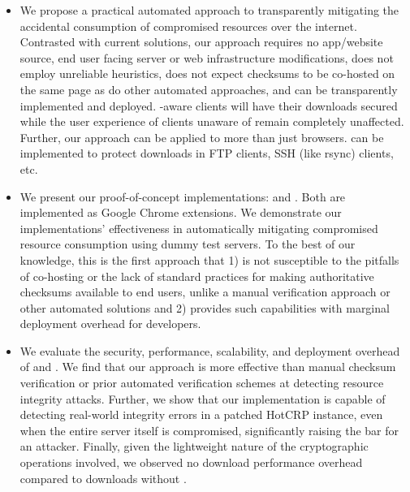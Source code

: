 \begin{itemize}

  \item We propose a practical automated approach to transparently mitigating
  the accidental consumption of compromised resources over the internet.
  Contrasted with current solutions, our approach requires no app/website
  source, end user facing server or web infrastructure modifications, does not
  employ unreliable heuristics, does not expect checksums to be co-hosted on the
  same page as do other automated approaches, and can be transparently
  implemented and deployed. \SYSTEM{}-aware clients will have their downloads
  secured while the user experience of clients unaware of \SYSTEM{} remain
  completely unaffected. Further, our approach can be applied to more than just
  browsers. \SYSTEM{} can be implemented to protect downloads in FTP clients,
  SSH (like rsync) clients, etc.

  \item We present our proof-of-concept \SYSTEM{} implementations: \DNSSYS{} and
  \DHTSYS{}. Both are implemented as Google Chrome extensions. We demonstrate
  our implementations' effectiveness in automatically mitigating compromised
  resource consumption using dummy test servers. To the best of our knowledge,
  this is the first approach that 1) is not susceptible to the pitfalls of
  co-hosting or the lack of standard practices for making authoritative
  checksums available to end users, unlike a manual verification approach or
  other automated solutions and 2) provides such capabilities with marginal
  deployment overhead for developers.

  \item We evaluate the security, performance, scalability, and deployment
  overhead of \DNSSYS{} and \DHTSYS{}. We find that our approach is more
  effective than manual checksum verification or prior automated verification
  schemes at detecting resource integrity attacks. Further, we show that our
  \DNSSYS{} implementation is capable of detecting real-world integrity errors
  in a patched HotCRP instance, even when the entire server itself is
  compromised, significantly raising the bar for an attacker. Finally, given the
  lightweight nature of the cryptographic operations involved, we observed no
  download performance overhead compared to downloads without \DNSSYS{}.

\end{itemize}

